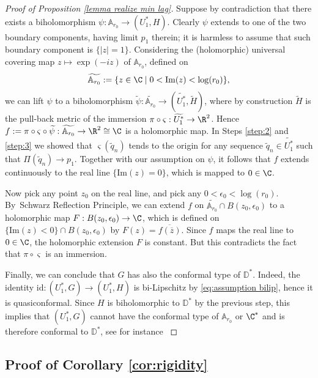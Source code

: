 \begin{proof}[Proof of Proposition \ref{lemma realize min lag}]
Suppose by contradiction that there exists a biholomorphism $\psi:\mathbb A_{r_0}\to (U_1^*,H)$. Clearly $\psi$ extends to one of the two boundary components, having limit $p_1$ therein; it is harmless to assume that such boundary component is $\{|z|=1\}$. Considering the (holomorphic) universal covering map $z\mapsto \exp({-iz})$ of $\mathbb A_{r_0}$, defined on
\begin{equation}\label{eq:univ cover annulus}
\widetilde{\mathbb A_{r_0}}:=\{z\in\C\mid0<\mathrm{Im}(z)<\log(r_0)\},
\end{equation}
we can lift $\psi$ to a biholomorphism $\widetilde\psi:\widetilde{\mathbb A_{r_0}}\to (\widetilde{U_1^*},\widetilde H)$, where by construction $\widetilde H$ is the pull-back metric of the immersion $\pi\circ\varsigma:\widetilde{U_1^*}\to\R^2$. Hence $f:=\pi\circ\varsigma\circ\widetilde\psi:\widetilde{\mathbb A_{r_0}}\to\R^2\cong \C$ is a holomorphic map. In Steps \ref{step:2} and \ref{step:3} we showed that $\varsigma(\widetilde q_n)$ tends to the origin for any sequence $\widetilde q_n\in \widetilde{U_1^*}$ such that $\Pi(\widetilde q_n)\to p_1$. Together with our assumption on $\psi$, it follows that $f$ extends continuously to the real line $\{\mathrm{Im}(z)=0\}$, which is mapped to $0\in\C$.

Now pick any point $z_0$ on the real line, and pick any $0<\epsilon_0<\log(r_0)$. By~Schwarz Reflection Principle, we can extend $f$ on $\widetilde{\mathbb A_{r_0}}\cap B(z_0,\epsilon_0)$ to a holomorphic map \hbox{$F:B(z_0,\epsilon_0)\to\C$}, which is defined on $\{\mathrm{Im}(z)<0\}\cap B(z_0,\epsilon_0)$ by $F(z)=\overline{f(\overline z)}$. Since $f$ maps the real line to $0\in \C$, the holomorphic extension $F$ is constant. But this contradicts the fact that $\pi\circ\varsigma$ is an immersion.

\step\label{step:6}
Finally, we can conclude that $G$ has also the conformal type of $\mathbb D^*$. Indeed, the identity $\mathrm{id}:(U_1^*,G)\to (U_1^*,H)$ is bi-Lipschitz by \eqref{eq:assumption bilip}, hence it is quasiconformal. Since $H$ is biholomorphic to $\mathbb D^*$ by the previous step, this implies that $(U_1^*,G)$ cannot have the conformal type of $\mathbb A_{r_0}$ or $\C^*$ and is therefore conformal to $\mathbb D^*$, see for instance \cite[\S 4.3]{zbMATH05042912}
\end{proof}

\subsection{Proof of Corollary \ref{cor:rigidity}}

